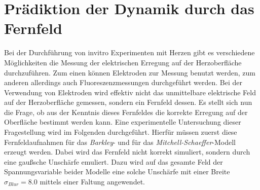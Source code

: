 \section{Prädiktion der Dynamik durch das Fernfeld}
Bei der Durchführung von invitro Experimenten mit Herzen gibt es verschiedene Möglichkeiten die Messung der elektrischen Erregung auf der Herzoberfläche durchzuführen. Zum einen können Elektroden zur Messung benutzt werden, zum anderen allerdings auch Fluoreszenzmessungen durchgeführt werden. Bei der Verwendung von Elektroden wird effektiv nicht das unmittelbare elektrische Feld auf der Herzoberfläche gemessen, sondern ein Fernfeld dessen. Es stellt sich nun die Frage, ob aus der Kenntnis dieses Fernfeldes die korrekte Erregung auf der Oberfläche bestimmt werden kann. Eine experimentelle Untersuchung dieser Fragestellung wird im Folgenden durchgeführt. Hierfür müssen zuerst diese Fernfeldaufnahmen für das \textit{Barkley}- und für das \textit{Mitchell-Schaeffer}-Modell erzeugt werden. Dabei wird das Fernfeld nicht korrekt simuliert, sondern durch eine gaußsche Unschärfe emuliert. Dazu wird auf das gesamte Feld der Spannungsvariable beider Modelle eine solche Unschärfe mit einer Breite $\sigma_{Blur} = 8.0$ mittels einer Faltung angewendet. 